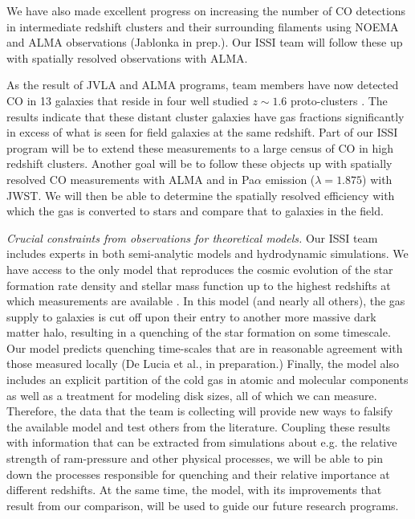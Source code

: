 \documentclass[11pt]{article}
\begin{document}
We have also made excellent progress on increasing the number of CO detections in intermediate redshift clusters and their surrounding filaments using NOEMA \citep{Jablonka13} and ALMA observations (Jablonka in prep.). Our ISSI team will follow these up with spatially resolved observations with ALMA.  

As the result of JVLA and ALMA programs, team members have now detected CO
in 13 galaxies that reside in four well studied $z\sim 1.6$ proto-clusters
\citep{Rudnick17b,Noble17}.  The results indicate that these distant cluster galaxies have gas fractions significantly in excess of what is seen for field galaxies at the same redshift.  Part of our ISSI program will be to extend these measurements to a large census of CO in high redshift clusters.  Another goal will be to follow these objects up with spatially resolved CO measurements with ALMA and in Pa$\alpha$ emission ($\lambda=1.875$\micron) with JWST.  We will then be able to determine the spatially resolved efficiency with which the gas is converted to stars and compare that to galaxies in the field.


\textit{Crucial constraints from observations for theoretical models.} Our ISSI team includes experts in both semi-analytic models and hydrodynamic simulations.  We have access to the only model that reproduces the cosmic evolution of the star formation rate density and stellar mass function up to the highest redshifts at which measurements are available \citep{Hirschmann16,Fontanot17}.  In this model (and nearly all others), the gas supply to galaxies is cut off upon their entry to another more massive dark matter halo, resulting in a quenching of the star formation on some timescale.  Our model predicts quenching time-scales that are in reasonable agreement with  those measured locally (De Lucia et al., in preparation.)  Finally, the model also includes
an explicit partition of the cold gas in atomic and molecular components \citep{Xie17} as
well as a treatment for modeling disk sizes, all of which we can measure. Therefore, the data that  the team is
collecting  will  provide new ways to falsify the available model and test others from the literature. Coupling
these results with information that can be extracted from simulations about
e.g. the relative strength of ram-pressure and other physical processes, we
will be able to pin down the processes responsible for quenching and their
relative importance  at  different  redshifts. At the  same time, the model, with its improvements that result from our comparison, will be used to guide our future research programs.
\end{document}

